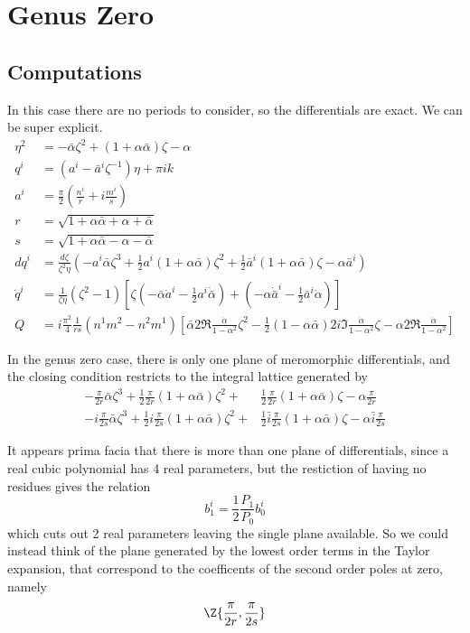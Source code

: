 \section{Genus Zero}
\label{sec:Genus Zero}
\subsection{Computations}

In this case there are no periods to consider, so the differentials are exact. We can be super explicit.
\begin{align*}
\eta^2 &= -\bar\alpha \zeta^2 + (1+\alpha\bar\alpha)\zeta - \alpha \\
q^i &= (a^i - \bar a^i \zeta^{-1})\eta + \pi i k \\
a^i &= \frac{\pi}{2}\left( \frac{n^i}{r} + i \frac{m^i}{s} \right) \\
r &= \sqrt{1 + \alpha\bar\alpha + \alpha + \bar\alpha} \\
s &= \sqrt{1 + \alpha\bar\alpha - \alpha - \bar\alpha} \\
dq^i &= \frac{d\zeta}{\zeta^2\eta} \left( -a^i\bar\alpha\zeta^3 + \frac{1}{2}a^i(1+\alpha\bar\alpha)\zeta^2 + \frac{1}{2}\bar a^i(1+\alpha\bar\alpha)\zeta  - \alpha\bar a^i\right) \\
\dot q^i &= \frac{1}{\zeta\eta}(\zeta^2-1)\left[ \zeta(-\bar\alpha\dot a^i - \frac{1}{2} a^i \dot{\bar\alpha}) + (-\alpha\dot {\bar a}^i - \frac{1}{2} \bar a^i \dot\alpha) \right]\\
Q &= i \frac{\pi^2}{4}\frac{1}{rs}(n^1m^2-n^2m^1) \left[ \bar\alpha 2\Re \frac{\dot\alpha}{1-\alpha^2}\zeta^2 - \frac{1}{2}(1-\alpha\bar\alpha)2i\Im \frac{\dot\alpha}{1-\alpha^2} \zeta - \alpha 2\Re \frac{\dot\alpha}{1-\alpha^2}\right]
\end{align*}

In the genus zero case, there is only one plane of meromorphic differentials, and the closing condition restricts to the integral lattice generated by
\begin{align*}
-\frac{\pi}{2r}\bar\alpha\zeta^3 + \frac{1}{2}\frac{\pi}{2r}(1+\alpha\bar\alpha)\zeta^2 +& \frac{1}{2}\frac{\pi}{2r}(1+\alpha\bar\alpha)\zeta  - \alpha\frac{\pi}{2r} \\
-i\frac{\pi}{2s}\bar\alpha\zeta^3 + \frac{1}{2}i\frac{\pi}{2s}(1+\alpha\bar\alpha)\zeta^2 +& \frac{1}{2}\bar i\frac{\pi}{2s}(1+\alpha\bar\alpha)\zeta  - \alpha\bar i\frac{\pi}{2s}
\end{align*}

It appears prima facia that there is more than one plane of differentials, since a real cubic polynomial has 4 real parameters, but the restiction of having no residues gives the relation
\[
b^i_1 = \frac{1}{2}\frac{P_1}{P_0}b^i_0
\]
which cuts out 2 real parameters leaving the single plane available. So we could instead think of the plane generated by the lowest order terms in the Taylor expansion, that correspond to the coefficents of the second order poles at zero, namely
\[
\Z\{\frac{\pi}{2r}, \frac{\pi}{2s}\}
\]

